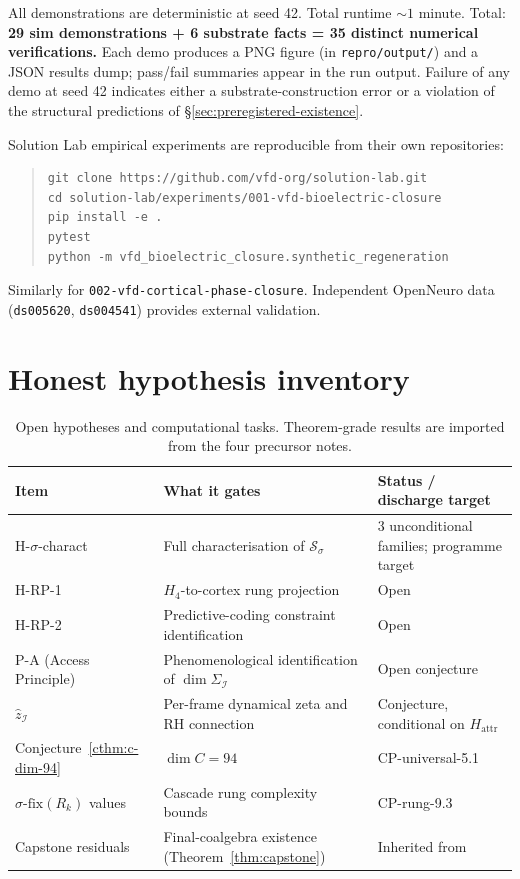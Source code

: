 \documentclass[11pt]{article}
\theoremstyle{plain}
\theoremstyle{definition}
\theoremstyle{remark}
\newcommand{\Ical}{\mathcal{I}}
\begin{document}
All demonstrations are deterministic at seed 42. Total runtime $\sim 1$ minute. Total: \textbf{29 sim demonstrations + 6 substrate facts = 35 distinct numerical verifications.} Each demo produces a PNG figure (in \texttt{repro/output/}) and a JSON results dump; pass/fail summaries appear in the run output. Failure of any demo at seed 42 indicates either a substrate-construction error or a violation of the structural predictions of \S\ref{sec:preregistered-existence}.

Solution Lab empirical experiments are reproducible from their own repositories:

\begin{quote}\small
\begin{verbatim}
git clone https://github.com/vfd-org/solution-lab.git
cd solution-lab/experiments/001-vfd-bioelectric-closure
pip install -e .
pytest
python -m vfd_bioelectric_closure.synthetic_regeneration
\end{verbatim}
\end{quote}

Similarly for \texttt{002-vfd-cortical-phase-closure}. Independent OpenNeuro data (\texttt{ds005620}, \texttt{ds004541}) provides external validation.

\section{Honest hypothesis inventory}\label{sec:hypothesis-inventory}

\begin{table}[h]
\centering
\small
\caption{Open hypotheses and computational tasks. Theorem-grade results are imported from the four precursor notes.}\label{tab:open-items}
\begin{tabular}{lp{4cm}l}
\toprule
Item & What it gates & Status / discharge target \\
\midrule
H-$\sigma$-charact & Full characterisation of $\mathcal{S}_\sigma$ & 3 unconditional families; programme target \\
H-RP-1 & $H_4$-to-cortex rung projection & Open \\
H-RP-2 & Predictive-coding constraint identification & Open \\
P-A (Access Principle) & Phenomenological identification of $\dim \Sigma_\Ical$ & Open conjecture \\
$\hat{z}_\Ical$ & Per-frame dynamical zeta and RH connection & Conjecture, conditional on $H_{\mathrm{attr}}$ \\
Conjecture~\ref{cthm:c-dim-94} & $\dim C = 94$ & CP-universal-5.1 \\
$\sigma\text{-fix}(R_k)$ values & Cascade rung complexity bounds & CP-rung-9.3 \\
Capstone residuals & Final-coalgebra existence (Theorem~\ref{thm:capstone}) & Inherited from \citet{SmartCapstone} \\
\bottomrule
\end{tabular}
\end{table}
\end{document}
